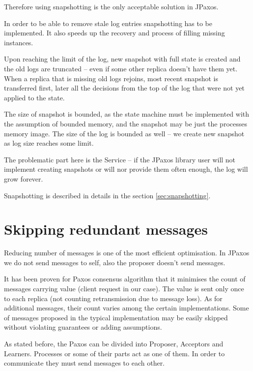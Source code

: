 Therefore using snapshotting is the only acceptable solution in JPaxos.


In order to be able to remove stale log entries snapshotting has to be implemented. It also speeds up the recovery and process of filling missing instances.

Upon reaching the limit of the log, new snapshot with full state is created and the old logs are truncated -- even if some other replica doesn't have them yet. When a replica that is missing old logs rejoins, most recent snapshot is transferred first, later all the decisions from the top of the log that were not yet applied to the state.

The size of snapshot is bounded, as the state machine must be implemented with the assumption of bounded memory, and the snapshot may be just the processes memory image. The size of the log is bounded as well -- we create new snapshot as log size reaches some limit.

The problematic part here is the Service -- if the JPaxos library user will not implement creating snapshots or will nor provide them often enough, the log will grow forever.

Snapshotting is described in details in the section \ref{sec:snapshotting}.

\section{Skipping redundant messages}
Reducing number of messages is one of the most efficient optimisation. In JPaxos we do not send messages to self, also the proposer doesn't send \accept messages.

It has been proven for Paxos consensus algorithm that it minimises the count of messages carrying value (client request in our case). The value is sent only once to each replica (not counting retransmission due to message loss). As for additional messages, their count varies among the certain implementations. Some of messages proposed in the typical implementation may be easily skipped without violating guarantees or adding assumptions.


As stated before, the Paxos can be divided into Proposer, Acceptors and Learners. Processes or some of their parts act as one of them. In order to communicate they must send messages to each other.

